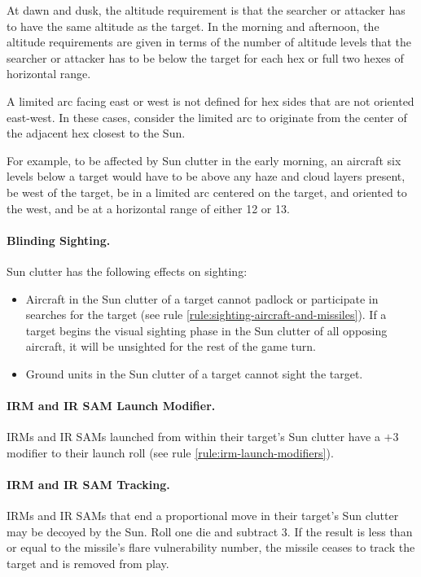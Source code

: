 \begin{advancedrules}
{\begin{itemize}
At dawn and dusk, the altitude requirement is that the searcher or attacker has to have the same altitude as the target. In the morning and afternoon, the altitude requirements are given in terms of the number of altitude levels that the searcher or attacker has to be below the target for each hex or full two hexes of horizontal range.

A limited arc facing east or west is not defined for hex sides that are not oriented east-west. In these cases, consider the limited arc to originate from the center of the adjacent hex closest to the Sun.

\end{itemize}

For example, to be affected by Sun clutter in the early morning, an aircraft six levels below a target would have to be above any haze and cloud layers present, be west of the target, be in a limited arc centered on the target, and oriented to the west, and be at a horizontal range of either 12 or 13.

\paragraph{Blinding Sighting.} Sun clutter has the following effects on sighting:
\begin{itemize}
\item 
Aircraft in the Sun clutter of a target cannot padlock or participate in searches for the target (see rule \ref{rule:sighting-aircraft-and-missiles}). If a target begins the visual sighting phase in the Sun clutter of all opposing aircraft, it will be unsighted for the rest of the game turn.
\item
Ground units in the Sun clutter of a target cannot sight the target.
\end{itemize}

\paragraph{IRM and IR SAM Launch Modifier.} 
IRMs and IR SAMs launched from within their target’s Sun clutter have a $+3$ modifier to their launch roll (see rule \ref{rule:irm-launch-modifiers}).

\paragraph{IRM and IR SAM Tracking.} 
IRMs and IR SAMs that end a proportional move in their target’s Sun clutter may be decoyed by the Sun. Roll one die and subtract 3. If the result is less than or equal to the missile’s flare vulnerability number, the missile ceases to track the target and is removed from play.

}
\end{advancedrules}
